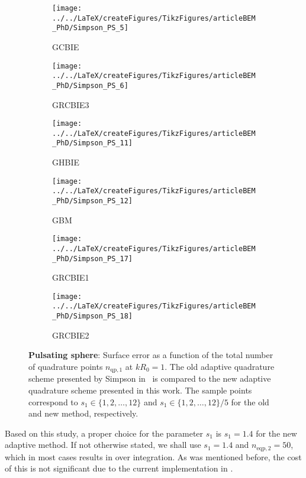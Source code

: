 \begin{figure}
	\begin{subfigure}{0.49\textwidth}
		\centering
		\texttt{[image: ../../LaTeX/createFigures/TikzFigures/articleBEM\_PhD/Simpson\_PS\_5]}
		\caption{GCBIE}
	\end{subfigure}%
	\hspace*{0.02\textwidth}%
	\begin{subfigure}{0.49\textwidth}
		\centering
		\texttt{[image: ../../LaTeX/createFigures/TikzFigures/articleBEM\_PhD/Simpson\_PS\_6]}
		\caption{GRCBIE3}
	\end{subfigure}
	\par\bigskip
	\par\bigskip
	\begin{subfigure}{0.49\textwidth}
		\centering
		\texttt{[image: ../../LaTeX/createFigures/TikzFigures/articleBEM\_PhD/Simpson\_PS\_11]}
		\caption{GHBIE}
	\end{subfigure}%
	\hspace*{0.02\textwidth}%
	\begin{subfigure}{0.49\textwidth}
		\centering
		\texttt{[image: ../../LaTeX/createFigures/TikzFigures/articleBEM\_PhD/Simpson\_PS\_12]}
		\caption{GBM}
	\end{subfigure}
	\par\bigskip
	\par\bigskip
	\begin{subfigure}{0.49\textwidth}
		\centering
		\texttt{[image: ../../LaTeX/createFigures/TikzFigures/articleBEM\_PhD/Simpson\_PS\_17]}
		\caption{GRCBIE1}
	\end{subfigure}%
	\hspace*{0.02\textwidth}%
	\begin{subfigure}{0.49\textwidth}
		\centering
		\texttt{[image: ../../LaTeX/createFigures/TikzFigures/articleBEM\_PhD/Simpson\_PS\_18]}
		\caption{GRCBIE2}
	\end{subfigure}
	\caption{\textbf{Pulsating sphere}: Surface error as a function of the total number of quadrature points $n_{\mathrm{qp,1}}$ at $kR_0=1$.  The old adaptive quadrature scheme presented by Simpson in~\cite{Simpson2014aib} is compared to the new adaptive quadrature scheme presented in this work. The sample points correspond to $s_1\in\{1,2,\dots,12\}$ and $s_1\in\{1,2,\dots,12\}/5$ for the old and new method, respectively.}
	\label{Fig3:Simpson_PS_2}
\end{figure}
Based on this study, a proper choice for the parameter $s_1$ is $s_1=1.4$ for the new adaptive method. If not otherwise stated, we shall use $s_1=1.4$ and $n_{\mathrm{eqp},2}=50$, which in most cases results in over integration. As was mentioned before, the cost of this is not significant due to the current implementation in \MATLAB.

